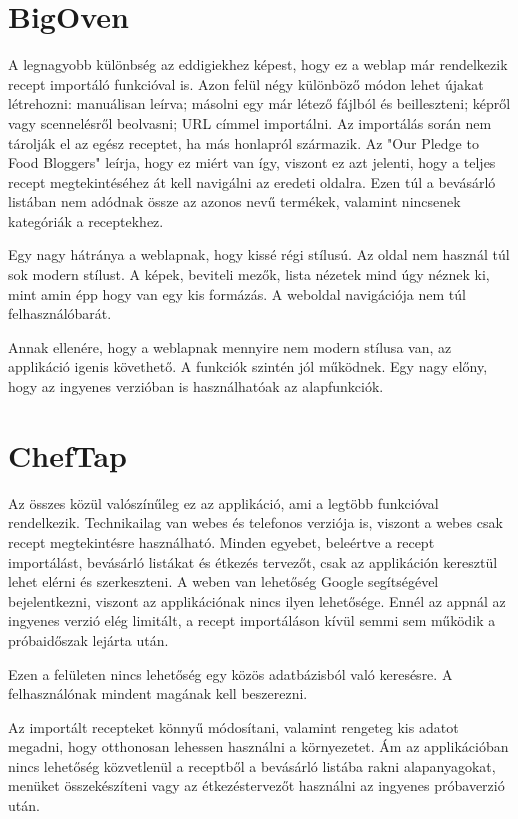 \documentclass[12pt]{report}
\theoremstyle{definition}
\begin{document}
\section{BigOven}
A legnagyobb különbség az eddigiekhez képest, hogy ez a weblap már rendelkezik recept importáló funkcióval is. Azon felül négy különböző módon lehet újakat létrehozni: manuálisan leírva; másolni egy már létező fájlból és beilleszteni; képről vagy scennelésről beolvasni; URL címmel importálni. Az importálás során nem tárolják el az egész receptet, ha más honlapról származik. Az "Our Pledge to Food Bloggers" leírja, hogy ez miért van így, viszont ez azt jelenti, hogy a teljes recept megtekintéséhez át kell navigálni az eredeti oldalra. Ezen túl a bevásárló listában nem adódnak össze az azonos nevű termékek, valamint nincsenek kategóriák a receptekhez.

Egy nagy hátránya a weblapnak, hogy kissé régi stílusú. Az oldal nem használ túl sok modern stílust. A képek, beviteli mezők, lista nézetek mind úgy néznek ki, mint amin épp hogy van egy kis formázás. A weboldal navigációja nem túl  felhasználóbarát. 

Annak ellenére, hogy a weblapnak mennyire nem modern stílusa van, az applikáció igenis követhető. A funkciók szintén jól működnek. Egy nagy előny, hogy az ingyenes verzióban is használhatóak az alapfunkciók. 


\section{ChefTap}
Az összes közül valószínűleg ez az applikáció, ami a legtöbb funkcióval rendelkezik. Technikailag van webes és telefonos verziója is, viszont a webes csak recept megtekintésre használható. Minden egyebet, beleértve a recept importálást, bevásárló listákat és étkezés tervezőt, csak az applikáción keresztül lehet elérni és szerkeszteni. A weben van lehetőség Google segítségével bejelentkezni, viszont az applikációnak nincs ilyen lehetősége. Ennél az appnál az ingyenes verzió elég limitált, a recept importáláson kívül semmi sem működik a próbaidőszak lejárta után.

Ezen a felületen nincs lehetőség egy közös adatbázisból való keresésre.  A felhasználónak mindent magának kell beszerezni. 

Az importált recepteket könnyű módosítani, valamint rengeteg kis adatot megadni, hogy otthonosan lehessen használni a környezetet. Ám az applikációban nincs lehetőség közvetlenül a receptből a bevásárló listába rakni alapanyagokat, menüket összekészíteni vagy az étkezéstervezőt használni az ingyenes próbaverzió után.
\end{document}
